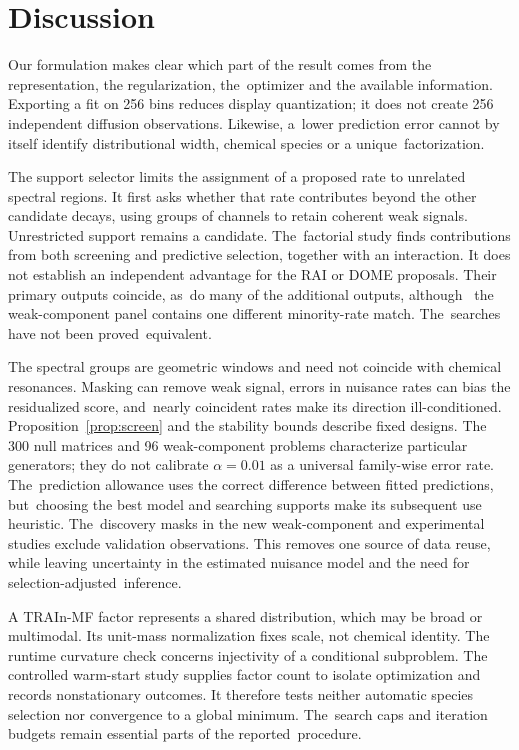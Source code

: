 \documentclass[mathematics,article,accept,moreauthors]{Definitions/mdpi}
\begin{document}
\FloatBarrier
\section{Discussion}
Our formulation makes clear which part of the result comes from the representation,
the regularization, the~optimizer and the available information. Exporting a fit
on 256 bins reduces display quantization; it does not create 256 independent
diffusion observations. Likewise, a~lower prediction error cannot by itself
identify distributional width, chemical species or a unique~factorization.

The support selector limits the assignment of a proposed rate to unrelated
spectral regions. It first asks whether that rate contributes beyond the other
candidate decays, using groups of channels to retain coherent weak signals.
Unrestricted support remains a candidate. The~factorial study finds contributions
from both screening and predictive selection, together with an interaction.
It does not establish an independent advantage for the RAI or DOME proposals.
Their primary outputs coincide, as~do many of the additional outputs, although~
the weak-component panel contains one different minority-rate match. The~searches
have not been proved~equivalent.

The spectral groups are geometric windows and need not coincide with chemical
resonances. Masking can remove weak signal, errors in nuisance rates can bias the
residualized score, and~nearly coincident rates make its direction ill-conditioned.
Proposition~\ref{prop:screen} and the stability bounds describe fixed designs.
The 300 null matrices and 96 weak-component problems characterize particular
generators; they do not calibrate $\alpha=0.01$ as a universal family-wise error
rate. The~prediction allowance uses the correct difference between fitted
predictions, but~choosing the best model and searching supports make its subsequent
use heuristic. The~discovery masks in the new weak-component and experimental
studies exclude validation observations. This removes one source of data reuse,
while leaving uncertainty in the estimated nuisance model and the need for
selection-adjusted~inference.

A TRAIn-MF factor represents a shared distribution, which may be broad or
multimodal. Its unit-mass normalization fixes scale, not chemical identity.
The runtime curvature check concerns injectivity of a conditional subproblem.
The controlled warm-start study supplies factor count to isolate optimization
and records nonstationary outcomes. It therefore tests neither automatic species
selection nor convergence to a global minimum. The~search caps and iteration
budgets remain essential parts of the reported~procedure.
\end{document}
